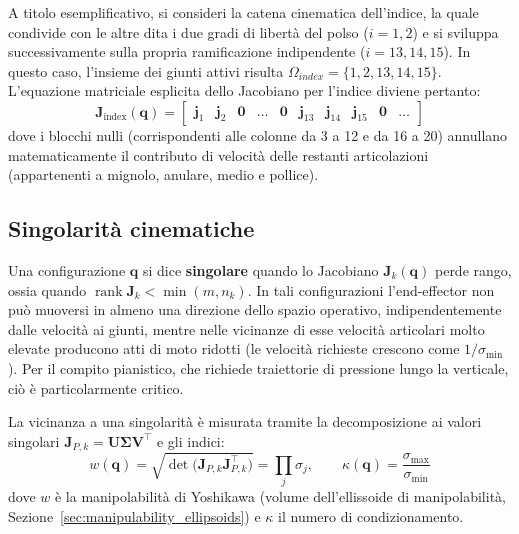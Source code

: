 A titolo esemplificativo, si consideri la catena cinematica dell'indice, la quale condivide con le altre dita i due gradi di libertà del polso ($i=1, 2$) e si sviluppa successivamente sulla propria ramificazione indipendente ($i=13, 14, 15$). In questo caso, l'insieme dei giunti attivi risulta $\Omega_{index} = \{1, 2, 13, 14, 15\}$. 
L'equazione matriciale esplicita dello Jacobiano per l'indice diviene pertanto:
\[
    \boldsymbol{J}_{\text{index}}(\boldsymbol{q}) = 
    \begin{bmatrix} 
        \boldsymbol{j}_1 & \boldsymbol{j}_2 & \boldsymbol{0} & \dots & \boldsymbol{0} & \boldsymbol{j}_{13} & \boldsymbol{j}_{14} & \boldsymbol{j}_{15} & \boldsymbol{0} & \dots
    \end{bmatrix}
\]
dove i blocchi nulli (corrispondenti alle colonne da 3 a 12 e da 16 a 20) annullano matematicamente il contributo di velocità delle restanti articolazioni (appartenenti a mignolo, anulare, medio e pollice).

\subsection{Singolarità cinematiche}

Una configurazione $\boldsymbol q$ si dice \textbf{singolare} quando lo Jacobiano $\boldsymbol J_k(\boldsymbol q)$ perde rango, ossia quando $\operatorname{rank}\boldsymbol J_k<\min(m,n_k)$. 
In tali configurazioni l'end-effector non può muoversi in almeno una direzione dello spazio operativo, indipendentemente dalle velocità ai giunti, mentre nelle vicinanze di esse velocità articolari molto elevate producono atti di moto ridotti (le velocità richieste crescono come $1/\sigma_{\min}$). 
Per il compito pianistico, che richiede traiettorie di pressione lungo la verticale, ciò è particolarmente critico.

La vicinanza a una singolarità è misurata tramite la decomposizione ai valori singolari $\boldsymbol J_{P,k}=\boldsymbol U\boldsymbol\Sigma\boldsymbol V^\top$ e gli indici:
\begin{equation}
    w(\boldsymbol q)=\sqrt{\det\!\big(\boldsymbol J_{P,k}\boldsymbol J_{P,k}^\top\big)}=\prod_{j}\sigma_j,
    \qquad
    \kappa(\boldsymbol q)=\frac{\sigma_{\max}}{\sigma_{\min}}
\end{equation}
dove $w$ è la manipolabilità di Yoshikawa (volume dell'ellissoide di manipolabilità, Sezione~\ref{sec:manipulability_ellipsoids}) e $\kappa$ il numero di condizionamento.

